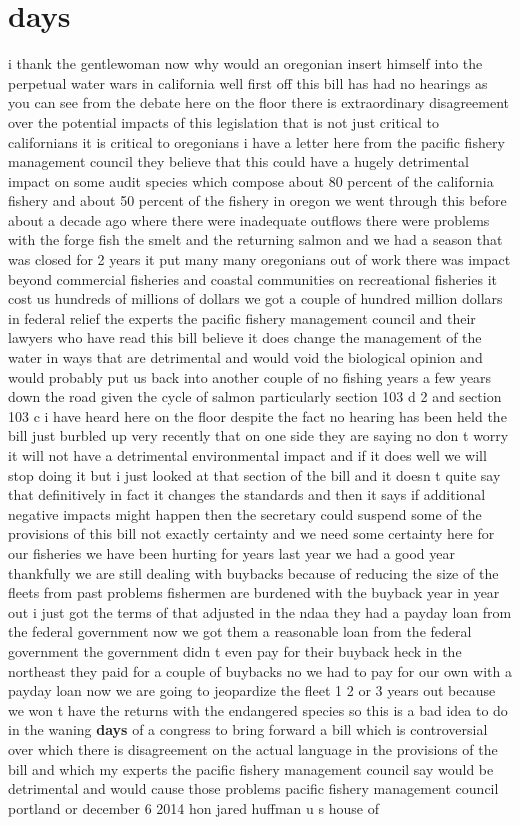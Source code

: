 \documentclass{article}
\begin{document}
\section*{days}
i thank the gentlewoman now why would an oregonian insert himself into the perpetual water wars in california well first off this bill has had no hearings as you can see from the debate here on the floor there is extraordinary disagreement over the potential impacts of this legislation that is not just critical to californians it is critical to oregonians i have a letter here from the pacific fishery management council they believe that this could have a hugely detrimental impact on some audit species which compose about 80 percent of the california fishery and about 50 percent of the fishery in oregon we went through this before about a decade ago where there were inadequate outflows there were problems with the forge fish the smelt and the returning salmon and we had a season that was closed for 2 years it put many many oregonians out of work there was impact beyond commercial fisheries and coastal communities on recreational fisheries it cost us hundreds of millions of dollars we got a couple of hundred million dollars in federal relief the experts the pacific fishery management council and their lawyers who have read this bill believe it does change the management of the water in ways that are detrimental and would void the biological opinion and would probably put us back into another couple of no fishing years a few years down the road given the cycle of salmon particularly section 103 d 2 and section 103 c i have heard here on the floor despite the fact no hearing has been held the bill just burbled up very recently that on one side they are saying no don t worry it will not have a detrimental environmental impact and if it does well we will stop doing it but i just looked at that section of the bill and it doesn t quite say that definitively in fact it changes the standards and then it says if additional negative impacts might happen then the secretary could suspend some of the provisions of this bill not exactly certainty and we need some certainty here for our fisheries we have been hurting for years last year we had a good year thankfully we are still dealing with buybacks because of reducing the size of the fleets from past problems fishermen are burdened with the buyback year in year out i just got the terms of that adjusted in the ndaa they had a payday loan from the federal government now we got them a reasonable loan from the federal government the government didn t even pay for their buyback heck in the northeast they paid for a couple of buybacks no we had to pay for our own with a payday loan now we are going to jeopardize the fleet 1 2 or 3 years out because we won t have the returns with the endangered species so this is a bad idea to do in the waning {\bf \color{red} days} of a congress to bring forward a bill which is controversial over which there is disagreement on the actual language in the provisions of the bill and which my experts the pacific fishery management council say would be detrimental and would cause those problems pacific fishery management council portland or december 6 2014 hon jared huffman u s house of 
\end{document}
